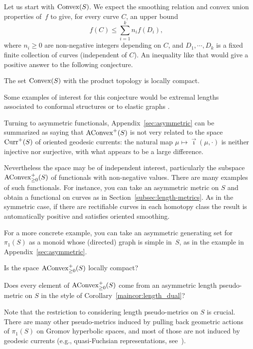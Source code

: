 Let us start with $\mathrm{Convex}(S)$. 
We expect the smoothing relation and convex union properties of~$f$ to
give, for every curve $C$, an upper bound
\[
f(C) \leq \sum_{i=1}^k n_i f(D_i),
\]
where $n_i \geq 0$ are non-negative integers depending on $C$, and $D_1,\cdots, D_k$ is a fixed finite collection of curves (independent of $C$). An inequality like that would give a positive answer to the following conjecture.

\begin{conjecture}\label{conj:convex-compact}
The set $\mathrm{Convex}(S)$ with the product topology is locally compact.
\end{conjecture}

Some examples of interest for this conjecture would be extremal
lengths associated to conformal structures or to elastic graphs
\cite[Sections 4.8 and 4.9]{MGT21:Smoothings}.

Turning to asymmetric functionals, Appendix~\ref{sec:asymmetric} can be summarized as saying that
$\mathrm{AConvex}^+(S)$ is not very related to the space $\operatorname{Curr}^+(S)$ of
oriented geodesic currents: the natural map $\mu \mapsto
\vec\imath(\mu,\cdot)$ is neither injective nor surjective, with what
appears to be a large difference.

Nevertheless the space may be of independent
interest, particularly the subspace $\mathrm{AConvex}_{\ge 0}^+(S)$ of
functionals with non-negative values.
There are many examples of such functionals. For instance,
you can take an asymmetric metric on $S$ and obtain a functional
on curves as in Section~\ref{subsec:length-metrics}. As in the
symmetric case, if there are rectifiable curves in each homotopy class
the result is automatically positive and satisfies oriented smoothing.

For a more concrete example, you can take an asymmetric generating set
for $\pi_1(S)$ as a monoid whose (directed) graph is simple in~$S$, as
in the example in Appendix~\ref{sec:asymmetric}.

\begin{question}\label{quest:AConvex+-compact}
  Is the space $\mathrm{AConvex}^+_{\ge 0}(S)$ locally compact?
\end{question}
\begin{question}\label{quest:asym-pseudo-metric}
  Does every element of $\mathrm{AConvex}^+_{\ge 0}(S)$ come from an
  asymmetric length pseudo-metric on $S$ in the style of
  Corollary~\ref{maincor:length_dual}?
\end{question}

  Note that the restriction to considering length pseudo-metrics on $S$ is crucial. There are many other pseudo-metrics induced by pulling back geometric actions of $\pi_1(S)$ on Gromov hyperbolic spaces, and most of those are not induced by geodesic currents (e.g., quasi-Fuchsian representations, see~\cite{FF22:QF}).

